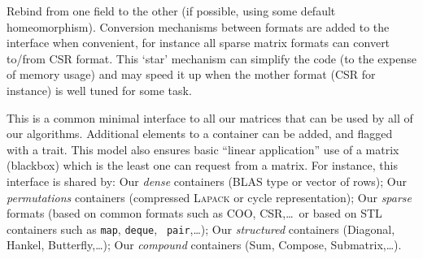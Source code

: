 %
		Rebind from one field to the other (if
		possible, using some default homeomorphism).
%
	 Conversion mechanisms between formats are added to the interface when
	 convenient, for instance all sparse matrix formats can convert to/from
	 CSR format.  This `star' mechanism can simplify the code (to the
	 expense of memory usage) and may speed it up when the mother format
	 (CSR for instance) is well tuned for some task.
%
	 \par
%
This is a common minimal interface to all our matrices that can be used by all
of our algorithms. Additional elements to a container can be added, and flagged
with a trait. This model also ensures basic ``linear application'' use of a
matrix (blackbox) which is the least one can request from a matrix.  For
instance, this interface is shared by: Our \emph{dense} containers (BLAS type or
vector of rows); Our  \emph{permutations} containers (compressed \textsc{Lapack} or
cycle representation); Our \emph{sparse} formats (based on common formats such as
COO, CSR,\ldots\ or based on STL containers such as {\tt map}, {\tt deque}, {\tt
pair},\ldots); Our \emph{structured} containers (Diagonal, Hankel, Butterfly,\ldots);
Our \emph{compound} containers (Sum, Compose, Submatrix,\ldots).
%
